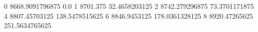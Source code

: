 0 8668.9091796875 0.0
1 8701.375 32.4658203125
2 8742.279296875 73.3701171875
4 8807.45703125 138.5478515625
6 8846.9453125 178.0361328125
8 8920.47265625 251.5634765625

